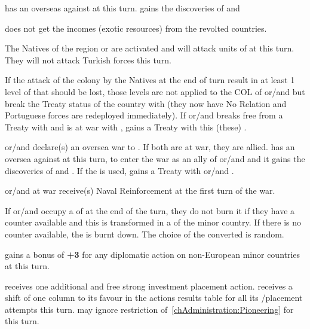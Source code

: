 \phdipl
\aparag \TUR has an overseas \CB against \POR at this turn. \TUR gains the
discoveries of  and 

\phadm
\POR does not get the incomes (exotic resources) from the revolted countries.

\phmil
\aparag The Natives of the region \granderegionOman or \granderegionAden are
activated and will attack units of \POR at this turn. They will not attack
Turkish forces this turn.

\phinter
\aparag If the attack of the colony by the Natives at the end of turn result
in at least 1 level of \COL that should be lost, those levels are not applied
to the COL of \paysOman or/and \paysAden but break the Treaty status of the
country with \POR (they now have No Relation and Portuguese forces are
redeployed immediately).
\aparag If \paysOman or/and \paysAden breaks free from a Treaty with \POR and
\TUR is at war with \POR, \TUR gains a Treaty with this (these) \MIN.



\phevnt
\aparag \paysOman or/and \paysAden declare(s) an oversea war to \POR. If both
are at war, they are allied.
\aparag \TUR has an oversea \CB against \POR at this turn, to enter the war as
an ally of \paysOman or/and \paysAden and it gains the discoveries of
 and .  If the \CB is used, \TUR gains a
Treaty with \paysOman or/and \paysAden.

\phadm
\aparag \paysOman or/and \paysAden at war receive(s) Naval Reinforcement at
the first turn of the war.

\phinter
\aparag If \paysOman or/and \paysAden occupy a \TP of \POR at the end of the
turn, they do not burn it if they have a \TP counter available and this \TP is
transformed in a \TP of the minor country. If there is no counter available,
the \TP is burnt down. The choice of the \TP converted is random.




\phdipl
\aparag \POR gains a bonus of {\bf +3} for any diplomatic action on
non-European minor countries at this turn.

\phadm
\aparag \POR receives one additional and free strong investment \TP placement
action.
\aparag \POR receives a shift of one column to its favour in the actions
results table for all its \COL/\TP placement attempts this turn.
\aparag \POR may ignore restriction of~\ref{chAdministration:Pioneering} for
this turn.



